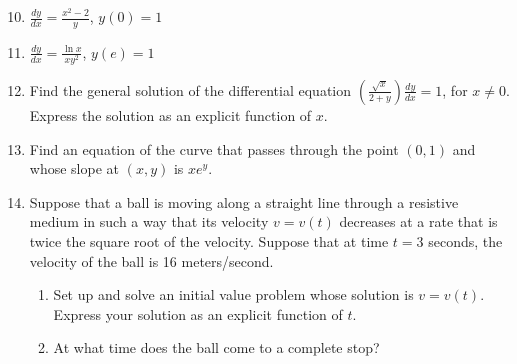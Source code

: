 \documentclass[12pt]{article}
\newif\ifans
\begin{document}
\begin{enumerate}
\setcounter{enumi}{9}

\item $\frac{dy}{dx}=\frac{x^2-2}{y}$, $y(0)=1$

\ifans{\fbox{$y=\sqrt{\frac{2x^3}{3}-4x+1}$}} \fi

\item $\frac{dy}{dx}=\frac{\ln{x}}{xy^2}$, $y(e)=1$

\ifans{\fbox{$y=\sqrt[3]{\frac{3(\ln{x})^2-1}{2}}$}} \fi

\item Find the general solution of the differential equation $\left(\frac{\sqrt{x}}{2+y}\right)\frac{dy}{dx}=1$, for $x \neq 0$.  Express the solution as an explicit function of $x$.

\ifans{\fbox{$y=Ce^{2\sqrt{x}}-2$, $C \neq 0$}} \fi

\item Find an equation of the curve that passes through the point $(0,1)$ and whose slope at $(x,y)$ is $xe^y$.

\ifans{\fbox{$y=-\ln{\left(\frac{1}{e}-\frac{x^2}{2}\right)}$}} \fi


\item Suppose that a ball is moving along a straight line through a resistive medium in such a way that its velocity $v=v(t)$ decreases at a rate that is twice the square root of the velocity.  Suppose that at time $t=3$ seconds, the velocity of the ball is 16 meters/second.

\begin{enumerate}

\item Set up and solve an initial value problem whose solution is $v=v(t)$.  Express your solution as an explicit function of $t$.

\ifans{\fbox{\parbox{1\linewidth}{Initial Value Problem:
$\left\{\begin{array}{l}
\frac{dv}{dt}=-2\sqrt{v}\\
\\
v(3)=16
\end{array}\right.$; Solution:
$v(t)=(7-t)^2$}}} \fi

\item At what time does the ball come to a complete stop?

\ifans{\fbox{The ball will stop at $t=7$ seconds.}} \fi

\end{enumerate}


\end{enumerate}
\end{document}
